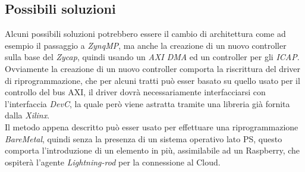 \subsection{Possibili soluzioni}
Alcuni possibili soluzioni potrebbero essere il cambio di architettura come ad esempio il passaggio a \textit{ZynqMP}, ma anche la creazione di un nuovo controller sulla base del \textit{Zycap}, quindi usando un \textit{AXI DMA} ed un controller per gli \textit{ICAP}. Ovviamente la creazione di un nuovo controller comporta la riscrittura del driver di riprogrammazione, che per alcuni tratti può esser basato su quello usato per il controllo del bus AXI, il driver dovrà necessariamente interfacciarsi con l'interfaccia \textit{DevC}, la quale però viene astratta tramite una libreria già fornita dalla \textit{Xilinx}.\\
Il metodo appena descritto può esser usato per effettuare una riprogrammazione \textit{BareMetal}, quindi senza la presenza di un sistema operativo lato PS, questo comporta l'introduzione di un elemento in più, assimilabile ad un Raspberry, che ospiterà l'agente \textit{Lightning-rod} per la connessione al Cloud.


